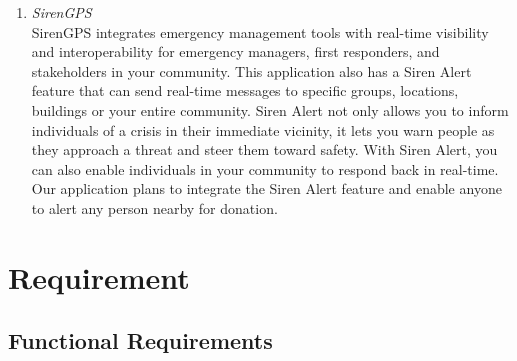 \documentclass[conference]{IEEEtran}
\begin{document}
\begin{enumerate}
\item \textit{SirenGPS} \\
SirenGPS integrates emergency management tools with real-time visibility and interoperability for emergency managers, first responders, and stakeholders in your community. This application also has a Siren Alert feature that can send real-time messages to specific groups, locations, buildings or your entire community. Siren Alert not only allows you to inform individuals of a crisis in their immediate vicinity, it lets you warn people as they approach a threat and steer them toward safety. With Siren Alert, you can also enable individuals in your community to respond back in real-time. Our application plans to integrate the Siren Alert feature and enable anyone to alert any person nearby for donation. 
\end{enumerate}


\section{Requirement}

\subsection{Functional Requirements\\}
\end{document}
